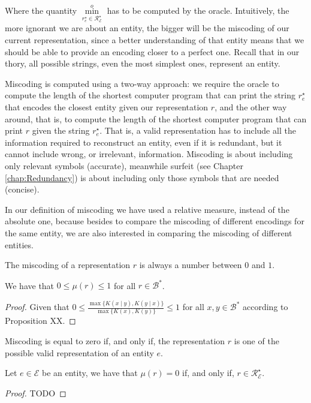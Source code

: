 Where the quantity $\overset{o}{ \underset{ r^\star_e \in \mathcal{R}^\star_\mathcal{E} } \min}$ has to be computed by the oracle. Intuitively, the more ignorant we are about an entity, the bigger will be the miscoding of our current representation, since a better understanding of that entity means that we should be able to provide an encoding closer to a perfect one. Recall that in our thory, all possible strings, even the most simplest ones, represent an entity.

Miscoding is computed using a two-way approach: we require the oracle to compute the length of the shortest computer program that can print the string $r^\star_e$ that encodes the closest entity given our representation $r$, and the other way around, that is, to compute the length of the shortest computer program that can print $r$ given the string $r^\star_e$. That is, a valid representation has to include all the information required to reconstruct an entity, even if it is redundant, but it cannot include wrong, or irrelevant, information. Miscoding is about including only relevant symbols (accurate), meanwhile surfeit (see Chapter \ref{chap:Redundancy}) is about including only those symbols that are needed (concise).

In our definition of miscoding we have used a relative measure, instead of the absolute one, because besides to compare the miscoding of different encodings for the same entity, we are also interested in comparing the miscoding of different entities.

The miscoding of a representation $r$ is always a number between $0$ and $1$.

\begin{proposition}
\label{prop:range_miscoding}
We have that $0 \leq \mu(r) \leq 1$ for all $r \in \mathcal{B}^\ast$.
\end{proposition}
\begin{proof}
Given that $0 \leq \frac{ \max\{ K(x \mid y), K(y \mid x) \} } { \max\{ K(x), K(y) \} } \leq 1$ for all $x, y \in \mathcal{B}^\ast$ according to Proposition {\color{red} XX}.
\end{proof}

Miscoding is equal to zero if, and only if, the representation $r$ is one of the possible valid representation of an entity $e$.

\begin{proposition}\label{prop:perfect_encoding}
Let $e \in \mathcal{E}$ be an entity, we have that $\mu(r) = 0$ if, and only if, $r \in \mathcal{R}^\star_\mathcal{E}$.
\end{proposition}
\begin{proof}
{\color{red} TODO}
\end{proof}


